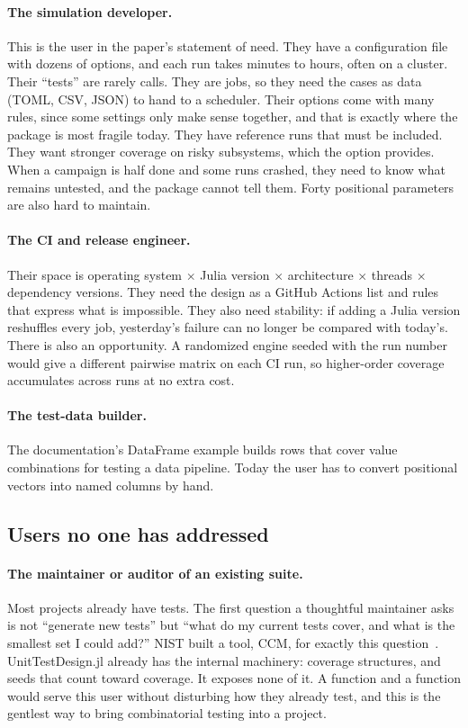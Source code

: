 \documentclass[11pt]{article}
\newcommand{\code}[1]{\texttt{\detokenize{#1}}}
\newcommand{\utd}{\textsf{UnitTestDesign.jl}\xspace}
\begin{document}
\paragraph{The simulation developer.}
This is the user in the paper's statement of need. They have a configuration
file with dozens of options, and each run takes minutes to hours, often on a
cluster. Their ``tests'' are rarely \code{@test} calls. They are jobs, so they
need the cases as data (TOML, CSV, JSON) to hand to a scheduler. Their options
come with many rules, since some settings only make sense together, and that
is exactly where the package is most fragile today. They have reference runs
that must be included. They want stronger coverage on risky subsystems, which
the \code{wayness} option provides. When a campaign is half done and some runs
crashed, they need to know what remains untested, and the package cannot tell
them. Forty positional parameters are also hard to maintain.

\paragraph{The CI and release engineer.}
Their space is operating system $\times$ Julia version $\times$ architecture
$\times$ threads $\times$ dependency versions. They need the design as a
GitHub Actions \code{include:} list and rules that express what is
impossible. They also need stability: if adding a Julia version reshuffles
every job, yesterday's failure can no longer be compared with today's. There
is also an opportunity. A randomized engine seeded with the run number
would give a different pairwise matrix on each CI run, so higher-order
coverage accumulates across runs at no extra cost.

\paragraph{The test-data builder.}
The documentation's DataFrame example builds rows that cover value
combinations for testing a data pipeline. Today the user has to convert
positional vectors into named columns by hand.

\subsection{Users no one has addressed}

\paragraph{The maintainer or auditor of an existing suite.}
Most projects already have tests. The first question a thoughtful maintainer
asks is not ``generate new tests'' but ``what do my current tests cover, and
what is the smallest set I could add?'' NIST built a tool, CCM, for exactly
this question~\cite{ccm}. \utd already has the internal machinery: coverage
structures, and seeds that count toward coverage. It exposes none of it. A
\code{coverage} function and a \code{topup} function would serve this user
without disturbing how they already test, and this is the gentlest way to
bring combinatorial testing into a project.
\end{document}
